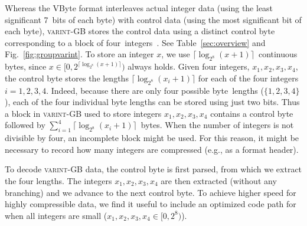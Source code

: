 \documentclass[compress]{elsarticle}
\newcommand{\vbyte}{VByte}
\newcommand{\varintgb}{\textsc{varint-GB}}
\begin{document}
 Whereas
the  \vbyte{} format interleaves actual integer data (using the least significant 7~bits of each byte) with control data (using the most significant bit of each byte), \varintgb{} stores the control
data using a distinct control byte corresponding to a block of four~integers~\cite{DeanOfficialplusslides:2009:CBL:1498759.1498761}.
See Table~\ref{sec:overview} and Fig.~\ref{fig:groupvarint}.
To store an integer $x$, we use  $\lceil \log_{2^8} (x + 1) \rceil $~continuous bytes, since
$x \in [0,2^{\lceil \log_{2^8} (x + 1) \rceil})$ always holds.
 Given four integers, $x_1, x_2, x_3, x_4$, the control
byte stores the lengths $\lceil \log_{2^8} (x_i + 1) \rceil$ for each of the four integers $i=1,2,3,4$. Indeed, because there are only four possible byte~lengths ($\{1,2,3,4\}$), each of the four individual byte lengths can be stored using just two bits.
Thus a block in \varintgb{} used to store integers $x_1, x_2, x_3, x_4$ contains a control byte followed
by  $\sum_{i=1}^4 \lceil \log_{2^8} (x_i + 1) \rceil$~bytes.
When the number of integers is not divisible by four, an incomplete block might be used. For this reason, it might be necessary to record how many integers are compressed  (e.g., as a format header).

To decode \varintgb{} data, the control byte is first parsed, from which we extract the four lengths.
The integers $x_1, x_2, x_3, x_4$ are then extracted (without any branching) and we advance to the next control byte. To achieve higher speed for highly compressible data, we find it useful to include an optimized code path for when all integers are small ($x_1, x_2, x_3, x_4 \in [0,2^8)$).
\end{document}
